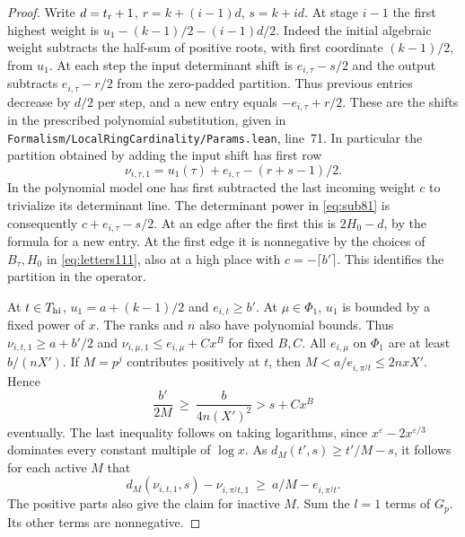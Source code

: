 \documentclass[a4paper,11pt]{article}
\theoremstyle{definition}
\theoremstyle{remark}
\newcommand{\srcloc}[2]{{\small\nolinkurl{#1.lean}}, line~#2}
\numberwithin{equation}{section}
\begin{document}
\begin{proof}
Write \(d=t_{\rm r}+1\), \(r=k+(i-1)d\), \(s=k+id\).
At stage \(i-1\) the first highest weight is
\(u_1-(k-1)/2-(i-1)d/2\). Indeed the initial algebraic weight
subtracts the half-sum of positive roots, with first coordinate
\((k-1)/2\), from \(u_1\). At each step the input determinant
shift is \(e_{i,\tau}-s/2\) and the output subtracts
\(e_{i,\tau}-r/2\) from the zero-padded partition.
Thus previous entries decrease by \(d/2\) per step, and a
new entry equals \(-e_{i,\tau}+r/2\). These are the shifts
in the prescribed polynomial substitution, given in
\srcloc{Formalism/LocalRingCardinality/Params}{71}.
In particular the partition obtained by adding the input shift
has first row
\[
               \nu_{i,\tau,1}=u_1(\tau)+e_{i,\tau}-(r+s-1)/2.
\]
In the polynomial model one has first subtracted the last
incoming weight \(c\) to trivialize its determinant line.
The determinant power in \eqref{eq:sub81} is consequently
\(c+e_{i,\tau}-s/2\). At an edge after the first this is
\(2H_0-d\), by the formula for a new entry. At the first edge it
is nonnegative by the choices of \(B_\tau,H_0\) in
\eqref{eq:letters111}, also at a high place with \(c=-\lceil b'\rceil\).
This identifies the partition in the operator.

At \(t\in T_{\rm hi}\), \(u_1=a+(k-1)/2\) and
\(e_{i,t}\ge b'\). At \(\mu\in\Phi_1\), \(u_1\) is bounded by
a fixed power of \(x\). The ranks and \(n\) also have polynomial
bounds. Thus \(\nu_{i,t,1}\ge a+b'/2\) and
\(\nu_{i,\mu,1}\le e_{i,\mu}+C x^B\) for fixed \(B,C\).
All \(e_{i,\mu}\) on \(\Phi_1\) are at least \(b/(nX')\).
If \(M=p^j\) contributes positively at \(t\), then
\(M<a/e_{i,\pi^jt}\le2nxX'\). Hence
\[
    \frac{b'}{2M}\ \ge\ \frac{b}{4n(X')^2}>s+Cx^B
\]
eventually. The last inequality follows on taking logarithms,
since \(x^\varepsilon-2x^{\varepsilon/3}\) dominates every
constant multiple of \(\log x\). As
\(d_M(t',s)\ge t'/M-s\), it follows for each active \(M\) that
\[
       d_M(\nu_{i,t,1},s)-\nu_{i,\pi^jt,1}
                  \ \ge\ a/M-e_{i,\pi^jt}.
\]
The positive parts also give the claim for inactive \(M\).
Sum the \(l=1\) terms of \(G_p\). Its other terms are nonnegative.
\end{proof}
\end{document}
